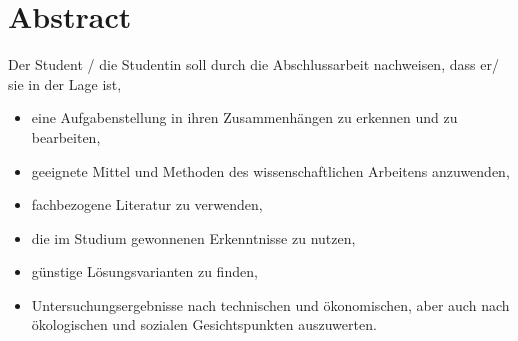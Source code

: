 \section*{Abstract}
Der Student / die Studentin soll durch die Abschlussarbeit nachweisen, dass er/ sie in der Lage ist, 
\begin{itemize}
\item eine Aufgabenstellung in ihren Zusammenhängen zu erkennen und zu bearbeiten, 
\item geeignete Mittel und Methoden des wissenschaftlichen Arbeitens anzuwenden, 
\item fachbezogene Literatur zu verwenden, 
\item die im Studium gewonnenen Erkenntnisse zu nutzen, 
\item günstige Lösungsvarianten zu finden,
\item Untersuchungsergebnisse nach technischen und ökonomischen, aber auch nach ökologischen und sozialen Gesichtspunkten auszuwerten.
\end{itemize}

